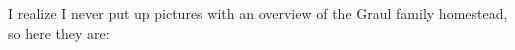 I realize I never put up pictures with an overview of the Graul family homestead, so here they are:  